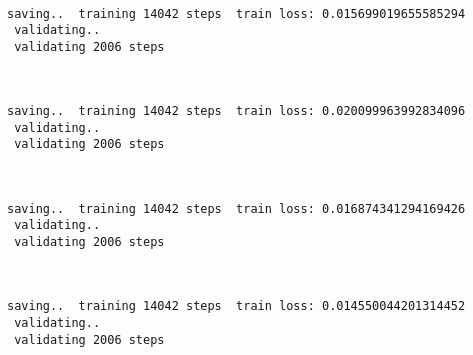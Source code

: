 \documentclass[11pt]{article}
\begin{document}
    \begin{center}
    \end{center}
    { \hspace*{\fill} \\}
    
    \begin{Verbatim}[commandchars=\\\{\}]
 saving..  training 14042 steps  train loss: 0.015699019655585294
 validating..
 validating 2006 steps
    \end{Verbatim}

    \begin{center}
    \end{center}
    { \hspace*{\fill} \\}
    
    \begin{Verbatim}[commandchars=\\\{\}]
 saving..  training 14042 steps  train loss: 0.020099963992834096
 validating..
 validating 2006 steps
    \end{Verbatim}

    \begin{center}
    \end{center}
    { \hspace*{\fill} \\}
    
    \begin{Verbatim}[commandchars=\\\{\}]
 saving..  training 14042 steps  train loss: 0.016874341294169426
 validating..
 validating 2006 steps
    \end{Verbatim}

    \begin{center}
    \end{center}
    { \hspace*{\fill} \\}
    
    \begin{Verbatim}[commandchars=\\\{\}]
 saving..  training 14042 steps  train loss: 0.014550044201314452
 validating..
 validating 2006 steps
    \end{Verbatim}
\end{document}
